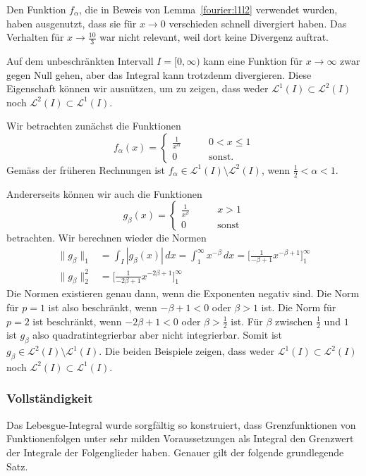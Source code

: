 \begin{beispiel}
Den Funktion $f_\alpha$, die in Beweis von Lemma~\ref{fourier:l1l2}
verwendet wurden, haben ausgenutzt, dass sie für $x\to 0$ verschieden 
schnell divergiert haben.
Das Verhalten für $x\to \frac{10}3$ war nicht relevant, weil dort keine
Divergenz auftrat.

Auf dem unbeschränkten Intervall $I=[0,\infty)$ kann eine Funktion 
für $x\to\infty$ zwar gegen Null gehen, aber das Integral kann trotzdenm
divergieren.
Diese Eigenschaft können wir ausnützen, um zu zeigen, dass weder
$\mathcal{L}^1(I)\subset\mathcal{L}^2(I)$
noch
$\mathcal{L}^2(I)\subset\mathcal{L}^1(I)$.

Wir betrachten zunächst die Funktionen
\[
f_\alpha(x) = \begin{cases}
\displaystyle\frac1{x^\alpha}&\qquad0<x\le 1\\
0&\qquad\text{sonst.}
\end{cases}
\]
Gemäss der früheren Rechnungen ist
$f_\alpha\in\mathcal{L}^1(I)\setminus\mathcal{L}^2(I)$,
wenn $\frac12<\alpha<1$.

Andererseits können wir auch die Funktionen
\[
g_\beta(x)
=
\begin{cases}
\displaystyle\frac1{x^\beta}&\qquad x>1\\
0&\qquad\text{sonst}
\end{cases}
\]
betrachten.
Wir berechnen wieder die Normen
\begin{align*}
\| g_\beta\|_1
&=
\int_I|g_\beta(x)|\,dx
=
\int_1^\infty x^{-\beta}\,dx
=
\biggl[
\frac1{-\beta+1}x^{-\beta+1}
\biggr]_1^\infty
\\
\|g_\beta\|_2^2
&=
\biggl[
\frac1{-2\beta+1}x^{-2\beta+1}
\biggr]_1^\infty
\end{align*}
Die Normen existieren genau dann, wenn die Exponenten negativ sind.
Die Norm für $p=1$ ist also beschränkt, wenn $-\beta+1<0$ oder $\beta > 1$
ist.
Die Norm für $p=2$ ist beschränkt, wenn $-2\beta+1<0$ oder $\beta > \frac12$
ist.
Für $\beta$ zwischen $\frac12$ und $1$ ist $g_\beta$ also quadratintegrierbar
aber nicht integrierbar.
Somit ist $g_\beta\in\mathcal{L}^2(I)\setminus\mathcal{L}^1(I)$.
Die beiden Beispiele zeigen, dass weder
$\mathcal{L}^1(I)\subset\mathcal{L}^2(I)$
noch
$\mathcal{L}^2(I)\subset\mathcal{L}^1(I)$.
\end{beispiel}

\subsubsection{Vollständigkeit}
Das Lebesgue-Integral wurde sorgfältig so konstruiert, dass Grenzfunktionen
von Funktionenfolgen unter sehr milden Voraussetzungen als Integral den
Grenzwert der Integrale der Folgenglieder haben.
Genauer gilt der folgende grundlegende Satz.

